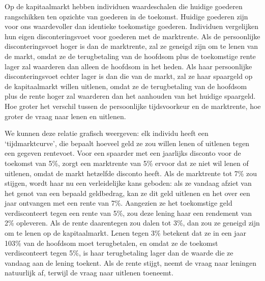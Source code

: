 Op de kapitaalmarkt hebben individuen waardeschalen die huidige goederen rangschikken ten opzichte van goederen in de toekomst. Huidige goederen zijn voor ons waardevoller dan identieke toekomstige goederen. Individuen vergelijken hun eigen disconteringsvoet voor goederen met de marktrente. Als de persoonlijke disconteringsvoet hoger is dan de marktrente, zal ze geneigd zijn om te lenen van de markt, omdat ze de terugbetaling van de hoofdsom plus de toekomstige rente lager zal waarderen dan alleen de hoofdsom in het heden. Als haar persoonlijke disconteringsvoet echter lager is dan die van de markt, zal ze haar spaargeld op de kapitaalmarkt willen uitlenen, omdat ze de terugbetaling van de hoofdsom plus de rente hoger zal waarderen dan het aanhouden van het huidige spaargeld. Hoe groter het verschil tussen de persoonlijke tijdsvoorkeur en de marktrente, hoe groter de vraag naar lenen en uitlenen.

We kunnen deze relatie grafisch weergeven: elk individu heeft een `tijdmarktcurve', die bepaalt hoeveel geld ze zou willen lenen of uitlenen tegen een gegeven rentevoet. Voor een spaarder met een jaarlijks disconto voor de toekomst van 5\%, zorgt een marktrente van 5\% ervoor dat ze niet wil lenen of uitlenen, omdat de markt hetzelfde disconto heeft. Als de marktrente tot 7\% zou stijgen, wordt haar nu een verleidelijke kans geboden: als ze vandaag afziet van het genot van een bepaald geldbedrag, kan ze dit geld uitlenen en het over een jaar ontvangen met een rente van 7\%. Aangezien ze het toekomstige geld verdisconteert tegen een rente van 5\%, zou deze lening haar een rendement van 2\% opleveren. Als de rente daarentegen zou dalen tot 3\%, dan zou ze geneigd zijn om te lenen op de kapitaalmarkt. Lenen tegen 3\% betekent dat ze in een jaar 103\% van de hoofdsom moet terugbetalen, en omdat ze de toekomst verdisconteert tegen 5\%, is haar terugbetaling lager dan de waarde die ze vandaag aan de lening toekent. Als de rente stijgt, neemt de vraag naar leningen natuurlijk af, terwijl de vraag naar uitlenen toeneemt.

